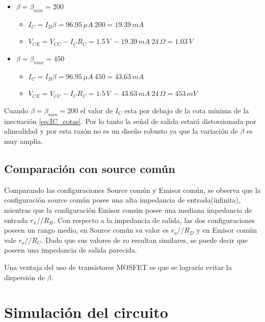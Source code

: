 \documentclass[10pt,spanish,a4paper,openany,notitlepage]{article}
\begin{document}
\begin{itemize}

\item $\beta = \beta_{min} = 200$

	\begin{itemize}
	\item $\displaystyle I_C = I_B \beta = 96.95\, \unit{\mu A}\ 200 = 19.39\, \unit{mA}$
	\item $\displaystyle V_{CE} = V_{CC} - I_C R_C = 1.5\, \unit{V}\ - 19.39\, \unit{mA}\ 24\, \unit{\Omega} = 1.03\, \unit{V}$
	\end{itemize}

\item $\beta = \beta_{max} = 450$

	\begin{itemize}
	\item $\displaystyle I_C = I_B \beta = 96.95\, \unit{\mu A}\ 450 = 43.63\, \unit{mA}$
	\item $\displaystyle V_{CE} = V_{CC} - I_C R_C = 1.5\, \unit{V}\ - 43.63\, \unit{mA}\ 24\, \unit{\Omega} = 453\, \unit{mV}$
	\end{itemize}

\end{itemize}

Cuando $\beta = \beta_{min} = 200$ el valor de $I_C$ esta por debajo
de la cota mínima de la inecuación \ref{eq:IC_cotas}.
Por lo tanto la señal de salida estará distorsionada por alinealidad y
por esta razón no es un diseño robusto ya que la variación de $\beta$
es muy amplia.


\subsection{Comparación con source común}

Comparando las configuraciones Source común y Emisor común, se observa 
que la configuración source común posee una alta impedancia de entrada(infinita), 
mientras que la configuración Emisor común posee una mediana impedancia de 
entrada $r_\pi//R_B$.  Con respecto  a la impedancia de salida, las dos 
configuraciones poseen un rango medio, en Source común su valor es $r_o//R_D$  y en Emisor común 
vale $r_o//R_C$.  Dado que sus valores de ro resultan similares, 
se puede decir que poseen una impedancia de salida parecida.

Una ventaja del uso de transistores MOSFET es que se lograría evitar
la dispersión de $\beta$. 

\section{Simulación del circuito}
\end{document}
